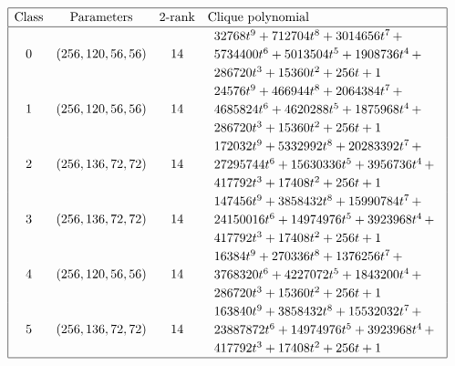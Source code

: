 \documentclass[12pt,a4paper]{article}
\begin{document}
\begin{table}[!bhpt] %
\small{}
\begin{align*}
\def\arraystretch{1.2}
\begin{array}{|cccl|}
\hline
\text{Class} &
\text{Parameters} &
\text{2-rank} &
\text{Clique polynomial}
\\
\hline
0 &
(256, 120, 56, 56) &
14 &
\begin{array}{l}
32768t^{9} + 712704t^{8} + 3014656t^{7}
\,+
\\
 5734400t^{6} + 5013504t^{5} + 1908736t^{4}
\,+
\\
 286720t^{3} + 15360t^{2} + 256t + 1
\end{array}
\\
1 &
(256, 120, 56, 56) &
14 &
\begin{array}{l}
24576t^{9} + 466944t^{8} + 2064384t^{7}
\,+
\\
 4685824t^{6} + 4620288t^{5} + 1875968t^{4}
\,+
\\
 286720t^{3} + 15360t^{2} + 256t + 1
\end{array}
\\
2 &
(256, 136, 72, 72) &
14 &
\begin{array}{l}
172032t^{9} + 5332992t^{8} + 20283392t^{7}
\,+
\\
 27295744t^{6} + 15630336t^{5} + 3956736t^{4}
\,+
\\
 417792t^{3} + 17408t^{2} + 256t + 1
\end{array}
\\
3 &
(256, 136, 72, 72) &
14 &
\begin{array}{l}
147456t^{9} + 3858432t^{8} + 15990784t^{7}
\,+
\\
 24150016t^{6} + 14974976t^{5} + 3923968t^{4}
\,+
\\
 417792t^{3} + 17408t^{2} + 256t + 1
\end{array}
\\
4 &
(256, 120, 56, 56) &
14 &
\begin{array}{l}
16384t^{9} + 270336t^{8} + 1376256t^{7}
\,+
\\
 3768320t^{6} + 4227072t^{5} + 1843200t^{4}
\,+
\\
 286720t^{3} + 15360t^{2} + 256t + 1
\end{array}
\\
5 &
(256, 136, 72, 72) &
14 &
\begin{array}{l}
163840t^{9} + 3858432t^{8} + 15532032t^{7}
\,+
\\
 23887872t^{6} + 14974976t^{5} + 3923968t^{4}
\,+
\\
 417792t^{3} + 17408t^{2} + 256t + 1
\end{array}
\\
\hline
\end{array}
\end{align*}
\caption{$[f_{8,8}]$ extended Cayley classes.}
\label{tab-c8_8_EC_classes}
\end{table}
\end{document}

